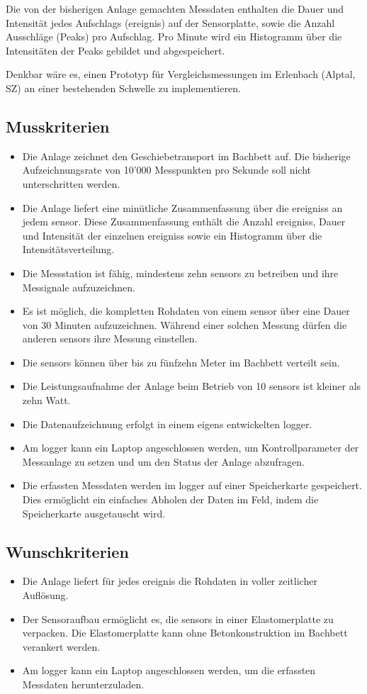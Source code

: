 Die von der bisherigen Anlage gemachten Messdaten enthalten die Dauer und Intensität jedes Aufschlags (\gls{ereignis}) auf der Sensorplatte, sowie die Anzahl Ausschläge (Peaks) pro Aufschlag. Pro Minute wird ein Histogramm über die Intensitäten der Peaks gebildet und abgespeichert.

Denkbar wäre es, einen Prototyp für Vergleichsmessungen im Erlenbach (Alptal, SZ) an einer bestehenden Schwelle zu implementieren.


\subsection{Musskriterien}
\begin{itemize}
\item Die Anlage zeichnet den Geschiebetransport im Bachbett auf. Die bisherige Aufzeichnungsrate von 10'000 Messpunkten pro Sekunde soll nicht unterschritten werden.
\item Die Anlage liefert eine minütliche Zusammenfassung über die \glspl{ereignis} an jedem \gls{sensor}. Diese Zusammenfassung enthält die Anzahl \glspl{ereignis}, Dauer und Intensität der einzelnen \glspl{ereignis} sowie ein Histogramm über die Intensitätsverteilung.
\item Die Messstation ist fähig, mindestens zehn \glspl{sensor} zu betreiben und ihre Messignale aufzuzeichnen.
\item Es ist möglich, die kompletten Rohdaten von einem \gls{sensor} über eine Dauer von 30 Minuten aufzuzeichnen. Während einer solchen Messung dürfen die anderen \glspl{sensor} ihre Messung einstellen.
\item Die \glspl{sensor} können über bis zu fünfzehn Meter im Bachbett verteilt sein.
\item Die Leistungsaufnahme der Anlage beim Betrieb von 10 \glspl{sensor} ist kleiner als zehn Watt.
\item Die Datenaufzeichnung erfolgt in einem eigens entwickelten \gls{logger}.
\item Am \gls{logger} kann ein Laptop angeschlossen werden, um Kontrollparameter der Messanlage zu setzen und um den Status der Anlage abzufragen.
\item Die erfassten Messdaten werden im \gls{logger} auf einer Speicherkarte gespeichert. Dies ermöglicht ein einfaches Abholen der Daten im Feld, indem die Speicherkarte ausgetauscht wird.
\end{itemize}
\subsection{Wunschkriterien}
\begin{itemize}
\item Die Anlage liefert für jedes \gls{ereignis} die Rohdaten in voller zeitlicher Auflösung.
\item Der Sensoraufbau ermöglicht es, die \glspl{sensor} in einer Elastomerplatte zu verpacken. Die Elastomerplatte kann ohne Betonkonstruktion im Bachbett verankert werden.
\item Am \gls{logger} kann ein Laptop angeschlossen werden, um die erfassten Messdaten herunterzuladen.
\end{itemize}
